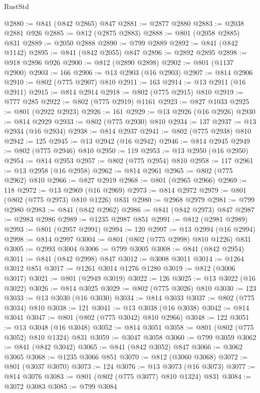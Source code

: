 \begin{lexlean}{RustStd}
\begin{coremodule}
{\begin{coremodule}
{{{{{@2880 := @841 (@842 @2865) @847
@2881 := @2877 @2880
@2883 := @2038 @2881 @926
@2885 := @812 (@2875 @2883)
@2888 := @801 (@2058 @2885) @831
@2889 := @2050 @2888
@2890 := @799 @2889
@2892 := @841 (@842 @1142)
@2895 := @841 (@842 @2055) @847
@2896 := @2892 @2895
@2898 := @918 @2896 @926
@2900 := @812 (@2890 @2898)
@2902 := @801 (@1137 @2900)
@2903 := 166
@2906 := @13 @2903 (@16 @2903)
@2907 := @814 @2906
@2910 := @802 (@775 @2907) @810
@2911 := 163
@2914 := @13 @2911 (@16 @2911)
@2915 := @814 @2914
@2918 := @802 (@775 @2915) @810
@2919 := @777 @285
@2922 := @802 (@775 @2919) @1161
@2923 := @827 @1033
@2925 := @801 (@2922 @2923)
@2926 := 161
@2929 := @13 @2926 (@16 @2926)
@2930 := @814 @2929
@2933 := @802 (@775 @2930) @810
@2934 := 137
@2937 := @13 @2934 (@16 @2934)
@2938 := @814 @2937
@2941 := @802 (@775 @2938) @810
@2942 := 125
@2945 := @13 @2942 (@16 @2942)
@2946 := @814 @2945
@2949 := @802 (@775 @2946) @810
@2950 := 119
@2953 := @13 @2950 (@16 @2950)
@2954 := @814 @2953
@2957 := @802 (@775 @2954) @810
@2958 := 117
@2961 := @13 @2958 (@16 @2958)
@2962 := @814 @2961
@2965 := @802 (@775 @2962) @810
@2966 := @827 @2919
@2968 := @801 (@2965 @2966)
@2969 := 118
@2972 := @13 @2969 (@16 @2969)
@2973 := @814 @2972
@2979 := @801 (@802 (@775 @2973) @810 @1226) @831
@2980 := @2968 @2979
@2981 := @799 @2980
@2983 := @841 (@842 @2962)
@2986 := @841 (@842 @2973) @847
@2987 := @2983 @2986
@2989 := @1235 @2987 @851
@2991 := @812 (@2981 @2989)
@2993 := @801 (@2957 @2991)
@2994 := 120
@2997 := @13 @2994 (@16 @2994)
@2998 := @814 @2997
@3004 := @801 (@802 (@775 @2998) @810 @1226) @831
@3005 := @2993 @3004
@3006 := @799 @3005
@3008 := @841 (@842 @2954)
@3011 := @841 (@842 @2998) @847
@3012 := @3008 @3011
@3014 := @1264 @3012 @851
@3017 := @1261 @3014 @1276 @1280
@3019 := @812 (@3006 @3017)
@3021 := @801 (@2949 @3019)
@3022 := 126
@3025 := @13 @3022 (@16 @3022)
@3026 := @814 @3025
@3029 := @802 (@775 @3026) @810
@3030 := 123
@3033 := @13 @3030 (@16 @3030)
@3034 := @814 @3033
@3037 := @802 (@775 @3034) @810
@3038 := 121
@3041 := @13 @3038 (@16 @3038)
@3042 := @814 @3041
@3047 := @801 (@802 (@775 @3042) @810 @2966)
@3048 := 122
@3051 := @13 @3048 (@16 @3048)
@3052 := @814 @3051
@3058 := @801 (@802 (@775 @3052) @810 @1324) @831
@3059 := @3047 @3058
@3060 := @799 @3059
@3062 := @841 (@842 @3042)
@3065 := @841 (@842 @3052) @847
@3066 := @3062 @3065
@3068 := @1235 @3066 @851
@3070 := @812 (@3060 @3068)
@3072 := @801 (@3037 @3070)
@3073 := 124
@3076 := @13 @3073 (@16 @3073)
@3077 := @814 @3076
@3083 := @801 (@802 (@775 @3077) @810 @1324) @831
@3084 := @3072 @3083
@3085 := @799 @3084
}}}}}
\end{coremodule}}
\end{coremodule}
\end{lexlean}
